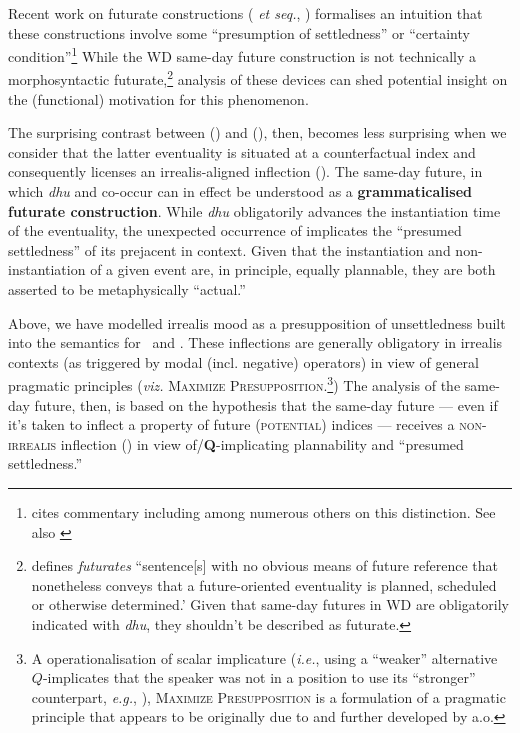 Recent work on futurate constructions (\citealp[see e.g.,][]{Copley2009,Copley2008a} \textit{et seq.}, \citealp{Kaufmann2002,Kaufmann2005}) formalises an intuition that these constructions involve some ``presumption of settledness'' or ``certainty condition''\footnote{\citet{Kaufmann2002} cites commentary including \citet{Dowty1979,Comrie1985} among numerous others on this distinction. See also \citet[note 1]{Copley2008a}} While the WD same-day future construction is not technically a morphosyntactic futurate,\footnote{\citet[261]{Copley2008a} defines \textit{futurates} ``sentence[s] with no obvious means of future reference that nonetheless conveys that a future-oriented eventuality is planned, scheduled or otherwise determined.' Given that same-day futures in WD are obligatorily indicated with \textit{dhu}, they shouldn't be described as futurate.} analysis of these devices can shed potential insight on the (functional) motivation for this phenomenon.

The surprising contrast between () and (), then, becomes less surprising when we consider that the latter eventuality is situated at a counterfactual index and consequently licenses an irrealis-aligned inflection (\II). The same-day future, in which \textit{dhu} and \I{} co-occur can in effect be understood as a \textbf{grammaticalised futurate construction}. While \textit{dhu} obligatorily advances the instantiation time of the eventuality, the unexpected occurrence of \I{} implicates the ``presumed settledness'' of its prejacent in context. Given that the instantiation and non-instantiation of a given event are, in principle, equally plannable, they are both asserted to be metaphysically ``actual.''

Above, we have modelled irrealis mood as a presupposition of unsettledness built into the semantics for \II~and \IV. These inflections are generally obligatory in irrealis contexts (as triggered by modal (incl. negative) operators) in view of general pragmatic principles (\textit{viz.} \textsc{Maximize Presupposition.}\footnote{A operationalisation of scalar implicature (\textit{i.e.}, using a ``weaker'' alternative $ Q $-implicates that the speaker was not in a position to use its ``stronger'' counterpart,\textit{ e.g.}, \citealt{Horn1984}), \textsc{Maximize Presupposition} is a formulation of a pragmatic principle that appears to be originally due to \citet{Heim1991} and further developed by \citet{Sauerland2009,Percus2006} a.o.}) The analysis of the same-day future, then, is based on the hypothesis that the same-day future --- even if it's taken to inflect a property of future (\textsc{potential}) indices --- receives a \textsc{non-irrealis} inflection (\I{}) in view of/\textbf{Q}-implicating plannability and ``presumed settledness.'' 

